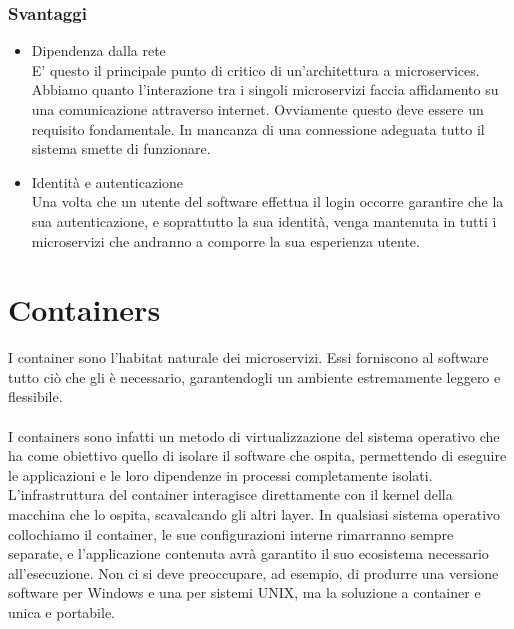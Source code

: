 \subsubsection{Svantaggi}
\begin{itemize}
	\item Dipendenza dalla rete \\
	E' questo il principale punto di critico di un'architettura a microservices. Abbiamo quanto l'interazione tra i singoli microservizi faccia affidamento su una comunicazione attraverso internet. Ovviamente questo deve essere un requisito fondamentale. In mancanza di una connessione adeguata tutto il sistema smette di funzionare.
	
	\item Identità e autenticazione \\
	Una volta che un utente del software effettua il login occorre garantire che la sua autenticazione, e soprattutto la sua identità, venga mantenuta in tutti i microservizi che andranno a comporre la sua esperienza utente.
\end{itemize}

\section{Containers}
I container sono l'habitat naturale dei microservizi. Essi forniscono al software tutto ciò che gli è necessario, garantendogli un ambiente estremamente leggero e flessibile.

\paragraph{}
I containers sono infatti un metodo di virtualizzazione del sistema operativo che ha come obiettivo quello di isolare il software che ospita, permettendo di eseguire le applicazioni e le loro dipendenze in processi completamente isolati. L'infrastruttura del container interagisce direttamente con il kernel della macchina che lo ospita, scavalcando gli altri layer. In qualsiasi sistema operativo collochiamo il container, le sue configurazioni interne rimarranno sempre separate, e l'applicazione contenuta avrà garantito il suo ecosistema necessario all'esecuzione. Non ci si deve preoccupare, ad esempio, di produrre una versione software per Windows e una per sistemi UNIX, ma la soluzione a container e unica e portabile. 


